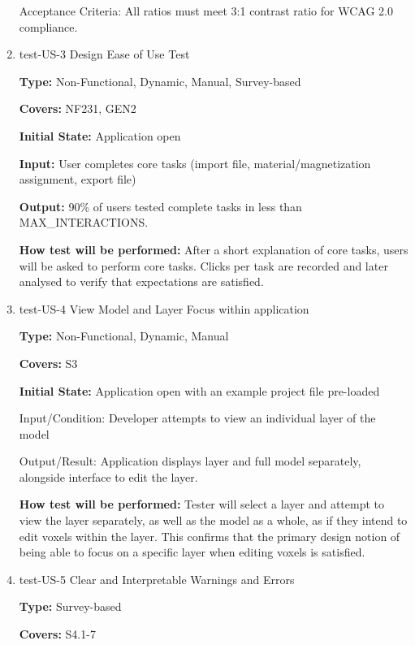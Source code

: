 \documentclass[12pt, titlepage]{article}
\begin{document}
\begin{enumerate}
Acceptance Criteria: All ratios must meet 3:1 contrast ratio for WCAG 2.0 compliance.

\item{test-US-3 Design Ease of Use Test\\}

\textbf{Type:} Non-Functional, Dynamic, Manual, Survey-based

\textbf{Covers:} NF231, GEN2 %
					
\textbf{Initial State:} Application open
					
\textbf{Input:} User completes core tasks (import file, material/magnetization assignment, export file)
					
\textbf{Output:} 90\% of users tested complete tasks in less than MAX\_INTERACTIONS.
					
\textbf{How test will be performed:} After a short explanation of core tasks, users will be asked to perform core tasks. Clicks per task
are recorded and later analysed to verify that expectations are satisfied.

\item{test-US-4 View Model and Layer Focus within application\\}

\textbf{Type:} Non-Functional, Dynamic, Manual

\textbf{Covers:} S3 %
					
\textbf{Initial State:} Application open with an example project file pre-loaded
					
Input/Condition: Developer attempts to view an individual layer of the model
					
Output/Result: Application displays layer and full model separately, alongside interface to edit the layer.
					
\textbf{How test will be performed:} Tester will select a layer and attempt to view the layer separately, as well as the model as a whole, 
as if they intend to edit voxels within the layer. This confirms that the primary design notion of being able to focus on a specific
layer when editing voxels is satisfied.

\item{test-US-5 Clear and Interpretable Warnings and Errors\\}

\textbf{Type:} Survey-based

\textbf{Covers:} S4.1-7 %
					

\end{enumerate}
\end{document}
